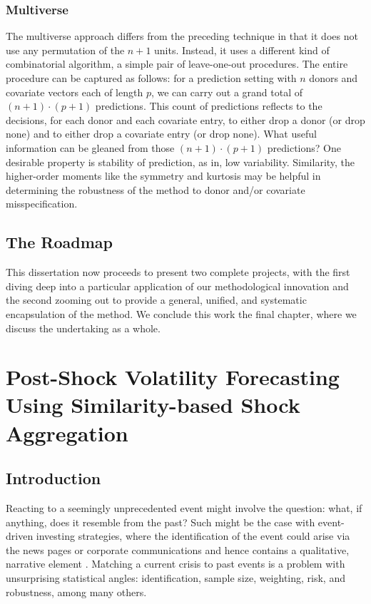 \documentclass{uiucthesis2021}
\theoremstyle{definition}
\begin{document}
\subsection{Multiverse}
The multiverse approach differs from the preceding technique in that it does not use any permutation of the $n+1$ units.  Instead, it uses a different kind of combinatorial algorithm, a simple pair of leave-one-out procedures.  The entire procedure can be captured as follows: for a prediction setting with $n$ donors and covariate vectors each of length $p$, we can carry out a grand total of $(n+1)\cdot(p+1)$ predictions.  This count of predictions reflects to the decisions, for each donor and each covariate entry, to either drop a donor (or drop none) and to either drop a covariate entry (or drop none).  What useful information can be gleaned from those $(n+1)\cdot(p+1)$ predictions?  One desirable property is stability of prediction, as in, low variability.  Similarity, the higher-order moments like the symmetry and kurtosis may be helpful in determining the robustness of the method to donor and/or covariate misspecification.



\section{The Roadmap}
This dissertation now proceeds to present two complete projects, with the first diving deep into a particular application of our methodological innovation and the second zooming out to provide a general, unified, and systematic encapsulation of the method.  We conclude this work the final chapter, where we discuss the undertaking as a whole.

\chapter{Post-Shock Volatility Forecasting Using Similarity-based Shock Aggregation}

\section{Introduction}

Reacting to a seemingly unprecedented event might involve the question: what, if anything, does it resemble from the past?  Such might be the case with event-driven investing strategies, where the identification of the event could arise via the news pages or corporate communications and hence contains a qualitative, narrative element \parencite[][]{Kenton}.  Matching a current crisis to past events is a problem with unsurprising statistical angles: identification, sample size, weighting, risk, and robustness, among many others.  
\end{document}
